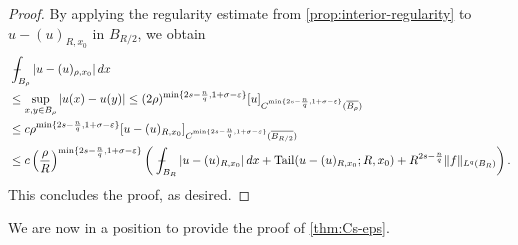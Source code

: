 \documentclass[11pt,reqno]{amsart}
\theoremstyle{plain}
\theoremstyle{definition}
\numberwithin{equation}{section}
\newcommand{\eps}{\varepsilon}
\newcommand{\1}{\mathbbm{1}}
\DeclareMathOperator{\tail}{Tail}
\renewcommand{\d}{\textnormal{\,d}}
\newcommand{\average}{{\mathchoice {\kern1ex\vcenter{\hrule height.4pt
width 6pt depth0pt} \kern-9.7pt} {\kern1ex\vcenter{\hrule
height.4pt width 4.3pt depth0pt} \kern-7pt} {} {} }}
\newcommand{\dashint}{\average\int}
\begin{document}
\begin{proof}
By applying the regularity estimate from \autoref{prop:interior-regularity} to $u-(u)_{R,x_0}$ in $B_{R/2}$, we obtain
\begin{align*}
&\dashint_{B_{\rho}} |u - (u)_{\rho,x_0}| \d x \\
&\le \sup_{x,y \in B_{\rho}} |u(x) - u(y)| \le (2 \rho)^{\min \{2s - \frac{n}{q} , 1+\sigma-\eps \} } [u]_{C^{\min \{2s - \frac{n}{q} , 1+\sigma-\eps \} } (\overline{B_{\rho}})} \\
&\le c \rho^{\min \{2s - \frac{n}{q} , 1+\sigma-\eps \} } [u - (u)_{R,x_0}]_{C^{\min \{2s - \frac{n}{q} , 1+\sigma-\eps \} }(\overline{B_{R/2}})} \\
&\le c \left( \frac{\rho}{R} \right)^{\min \{2s - \frac{n}{q} , 1+\sigma-\eps \} } \left( \dashint_{B_{R}} |u - (u)_{R,x_0}| \d x + \tail(u - (u)_{R,x_0}; R,x_0) + R^{2s - \frac{n}{q}} \Vert f \Vert_{L^q(B_{R})} \right).
\end{align*}
This concludes the proof, as desired.
\end{proof}

We are now in a position to provide the proof of \autoref{thm:Cs-eps}.
\end{document}
